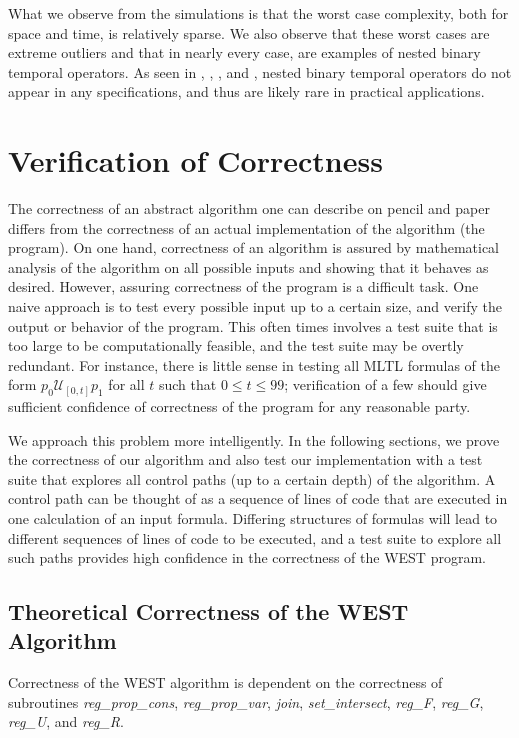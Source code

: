 \documentclass[runningheads]{llncs}
\begin{document}
\noindent What we observe from the simulations is that the worst case complexity, both for space and time, is relatively sparse. We also observe that these worst cases are extreme outliers and that in nearly every case, are examples of nested binary temporal operators. As seen in \cite{HLR21}, \cite{KZJZR20}, \cite{AJR22}, and \cite{HCHJR21}, nested binary temporal operators do not appear in any specifications, and thus are likely rare in practical applications.


\section{Verification of Correctness} \label{test}
 The correctness of an abstract algorithm one can describe on pencil and paper differs from the correctness of an actual implementation of the algorithm (the program). 
On one hand, correctness of an algorithm is assured by mathematical analysis of the algorithm on all possible inputs and showing that it behaves as desired. 
However, assuring correctness of the program is a difficult task.
One naive approach is to test every possible input up to a certain size, and verify the output or behavior of the program.
This often times involves a test suite that is too large to be computationally feasible, and the test suite may be overtly redundant. 
For instance, there is little sense in testing all MLTL formulas of the form $p_0 \mathcal{U}_{[0,t]} p_1$ for all $t$ such that $0 \leq t \leq 99$; verification of a few should give sufficient confidence of correctness of the program for any reasonable party. 

We approach this problem more intelligently. In the following sections, we prove the correctness of our algorithm and also test our implementation with a test suite that explores all control paths (up to a certain depth) of the algorithm. A control path can be thought of as a sequence of lines of code that are executed in one calculation of an input formula. Differing structures of formulas will lead to different sequences of lines of code to be executed, and a test suite to explore all such paths provides high confidence in the correctness of the WEST program.

\subsection{Theoretical Correctness of the WEST Algorithm}
 Correctness of the WEST algorithm is dependent on the correctness of subroutines \textit{reg\_prop\_cons}, \textit{reg\_prop\_var}, \textit{join}, \textit{set\_intersect}, \textit{reg\_F}, \textit{reg\_G}, \textit{reg\_U}, and \textit{reg\_R}. 
\end{document}

